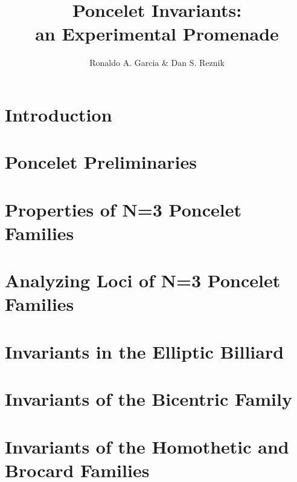 \documentclass{book}
\begin{document}
\title{Poncelet Invariants:\\an Experimental Promenade}
\author{Ronaldo A. Garcia \& Dan S. Reznik} 

\maketitle

\chapter{Introduction}
\label{chap:01-intro}
%

\chapter{Poncelet Preliminaries}
\label{chap:02-prelims}
%

\chapter{Properties of N=3 Poncelet Families}
\label{chap:03-n3-properties}


\chapter{Analyzing Loci of N=3 Poncelet Families}
\label{chap:04-n3-loci}
%

\chapter[Billiard Invariants]{Invariants in the Elliptic Billiard}
\label{chap:05-billiard}
%

\chapter[Bicentric Invariants]{Invariants of the Bicentric Family}
\label{chap:06-bicentric}
%

\chapter[Homothetic and Brocard Invariants]{Invariants of the Homothetic and Brocard Families}
\label{chap:07-homoth}
%
\end{document}
